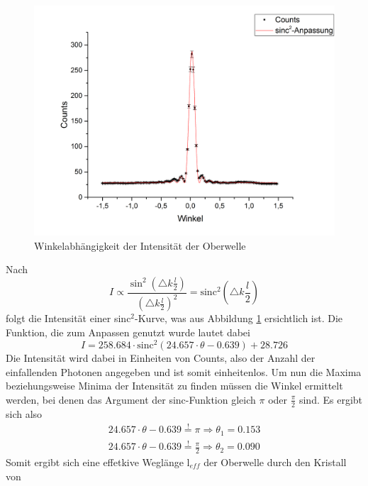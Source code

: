 \begin{figure}[H]
	\begin{center}
		\includegraphics[scale=.5]{Bilder/Winkel.png}
		\caption{Winkelabhängigkeit der Intensität der Oberwelle}
		\label{winkel}
	\end{center}
\end{figure}
Nach 
\begin{equation}
I\propto \frac{\sin^2\left(\triangle k \frac{l}{2}\right)}{\left(\triangle k \frac{l}{2}\right)^2}=\text{sinc}^2\left(\triangle k \frac{l}{2}\right)
\label{sinc}
\end{equation}
folgt die Intensität einer sinc$^2$-Kurve, was aus Abbildung \ref{winkel} ersichtlich ist. Die Funktion, die zum Anpassen genutzt wurde lautet dabei
\begin{equation}
I=258.684\cdot\text{sinc}^2\left(24.657\cdot\theta-0.639\right)+28.726
\end{equation}
Die Intensität wird dabei in Einheiten von Counts, also der Anzahl der einfallenden Photonen angegeben und ist somit einheitenlos. \newline
Um nun die Maxima beziehungsweise Minima der Intensität zu finden müssen die Winkel ermittelt werden, bei denen das Argument der sinc-Funktion gleich $\pi$ oder $\frac{\pi}{2}$ sind. Es ergibt sich also
\begin{eqnarray}
24.657\cdot\theta-0.639\overset{!}{=}\pi\Longrightarrow\theta_1=0.153\\
24.657\cdot\theta-0.639\overset{!}{=}\frac{\pi}{2}\Longrightarrow\theta_2=0.090
\end{eqnarray}
Somit ergibt sich eine effetkive Weglänge l$_{eff}$ der Oberwelle durch den Kristall von 
